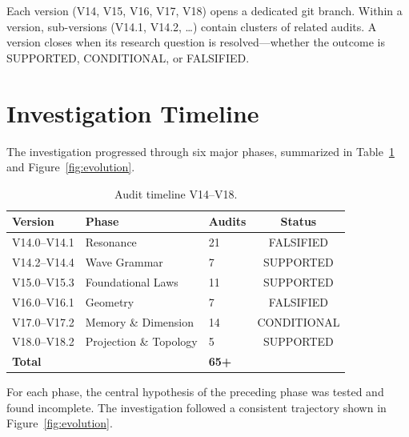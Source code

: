 \documentclass[11pt,a4paper,oneside]{report}
\newcommand{\supported}{\textcolor{supported}{SUPPORTED}}
\newcommand{\conditional}{\textcolor{conditional}{CONDITIONAL}}
\newcommand{\falsified}{\textcolor{falsified}{FALSIFIED}}
\begin{document}
Each version (V14, V15, V16, V17, V18) opens a dedicated git branch.
Within a version, sub-versions (V14.1, V14.2, \dots) contain clusters of
related audits. A version closes when its research question is resolved---whether
the outcome is \supported{}, \conditional{}, or \falsified{}.

\section{Investigation Timeline}

The investigation progressed through six major phases, summarized in
Table~\ref{tab:timeline} and Figure~\ref{fig:evolution}.

\begin{table}[h]
\centering
\caption{Audit timeline V14--V18.}
\label{tab:timeline}
\begin{tabular}{lllc}
\toprule
\textbf{Version} & \textbf{Phase} & \textbf{Audits} & \textbf{Status}\\
\midrule
V14.0--V14.1 & Resonance & 21 & \falsified{}\\
V14.2--V14.4 & Wave Grammar & 7 & \supported{}\\
V15.0--V15.3 & Foundational Laws & 11 & \supported{}\\
V16.0--V16.1 & Geometry & 7 & \falsified{}\\
V17.0--V17.2 & Memory \& Dimension & 14 & \conditional{}\\
V18.0--V18.2 & Projection \& Topology & 5 & \supported{}\\
\midrule
\textbf{Total} & & \textbf{65+} & \\
\bottomrule
\end{tabular}
\end{table}

For each phase, the central hypothesis of the preceding phase was tested and
found incomplete. The investigation followed a consistent trajectory shown in
Figure~\ref{fig:evolution}.
\end{document}

